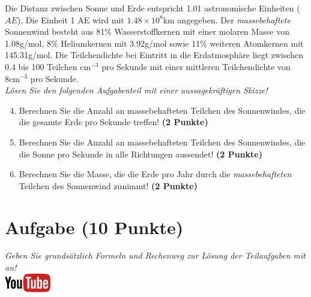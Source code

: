 \documentclass[a4paper, 9pt]{scrartcl}\usepackage[]{graphicx}\usepackage[]{xcolor}
\begin{document}
Die Distanz zwischen Sonne und Erde entspricht 1.01 astronomische Einheiten ($AE$). Die Einheit 1 AE wird mit \ensuremath{1.48\times 10^{8}}km angegeben. Der \textit{massebehaftete} Sonnenwind besteht aus 81\% Wasserstoffkernen mit einer molaren Masse von 1.08g/mol, 8\% Heliumkernen mit 3.92g/mol sowie 11\% weiteren Atomkernen mit  145.31g/mol. Die Teilchendichte bei Eintritt in die Erdatmosphäre liegt zwischen 0.4 bis 100 Teilchen cm$^{-3}$ pro Sekunde mit einer mittleren Teilchendichte von 8cm$^{-3}$ pro Sekunde. \\

\textit{Lösen Sie den folgenden Aufgabenteil mit einer aussagekräftigen Skizze!}

\begin{enumerate}
  \setcounter{enumi}{3}
\item Berechnen Sie die Anzahl an massebehafteten Teilchen des Sonnenwindes, die die gesamte Erde pro Sekunde treffen! \textbf{(2 Punkte)}
\item Berechnen Sie die Anzahl an massebehafteten Teilchen des Sonnenwindes, die die Sonne pro Sekunde in alle Richtungen aussendet! \textbf{(2 Punkte)}
\item Berechnen Sie die Masse, die die Erde pro Jahr durch die \textit{massebehafteten} Teilchen des Sonnenwind zunimmt! \textbf{(2 Punkte)}
\end{enumerate}


\clearpage

\section{Aufgabe \hfill (10 Punkte)}

\textit{Geben Sie grunds{\"a}tzlich Formeln und Rechenweg zur L{\"o}sung der
  Teilaufgaben mit an!} \\[1Ex]

\hfill\href{https://youtu.be/n451XnhtSh4}{\includegraphics[width = 2cm]{img/youtube}} %
\hspace{2Ex}
\end{document}
